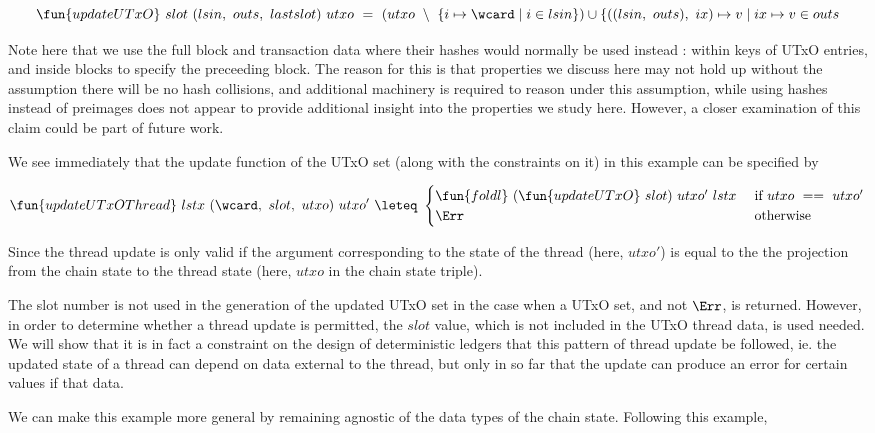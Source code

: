 \[ \fun{updateUTxO}~slot~(lsin,~outs,~lastslot)~utxo~=~
  (utxo~\setminus~\{ i \mapsto \wcard \mid i \in lsin \}) \cup \{ ((lsin,~outs),~ix) \mapsto v \mid ix \mapsto v \in outs  \]

Note here that we use the full block and transaction data where their hashes would
normally be used instead : within keys of UTxO entries, and inside
blocks to specify the preceeding block. The reason for this is that properties
we discuss here may not hold up without the assumption there will be no hash collisions,
and additional machinery is required to reason under this assumption, while using
hashes instead of preimages does not appear to provide additional insight into the
properties we study here. However, a closer examination of this claim could be
part of future work.

We see immediately that the update function of the UTxO set (along with the
constraints on it) in this example can be specified by

\[ \fun{updateUTxOThread} ~lstx ~(\wcard,~slot,~ utxo)~ utxo'~ \leteq~ \begin{cases}
  \fun{foldl}~(\fun{updateUTxO}~slot)~utxo'~lstx & \text { if } utxo~==~utxo' \\
  \Err & \text{ otherwise}
\end{cases}  \]

Since the thread update is only valid if the argument corresponding to the state of the
thread (here, $utxo'$) is equal to the the projection from the chain state to the
thread state (here, $utxo$ in the chain state triple).

The slot number is not used in the generation
of the updated UTxO set in the case when a UTxO set, and not $\Err$, is returned. However, in order to
determine whether a thread update is permitted, the $slot$ value, which
is not included in the UTxO thread data, is used needed.
We will show that it is in fact a constraint on the design of deterministic ledgers
that this pattern of thread update
be followed, ie. the updated state of a thread can depend on data external to the thread,
but only in so far that the update can produce an error for certain values if that data.

We can make this example more general by remaining agnostic of the data types of the
chain state. Following this example,

